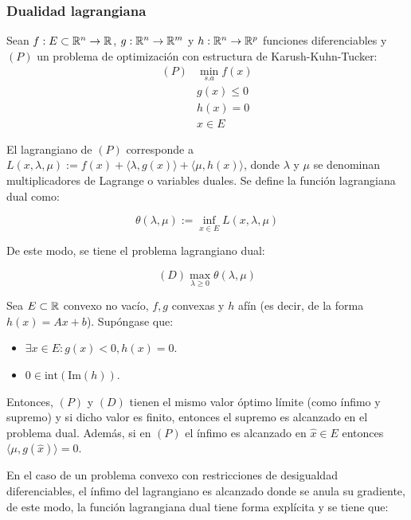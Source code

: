 \subsubsection{Dualidad lagrangiana}

Sean $f:E\subset\mathbb{R}^n\to\mathbb{R}$, $g:\mathbb{R}^n \to \mathbb{R}^m$ y $h:\mathbb{R}^n \to \mathbb{R}^p$ funciones diferenciables y $(P)$ un problema de optimización con estructura de Karush-Kuhn-Tucker:
\begin{equation}
	\begin{aligned}
		(P) & \min_{s.a} f(x)\\
		& g(x) \leq 0\\
		& h(x) = 0\\
		& x\in E
	\end{aligned}
\end{equation}
	

El lagrangiano de $(P)$ corresponde a $L(x,\lambda,\mu) := f(x) + \langle\lambda,g(x)\rangle + \langle\mu,h(x)\rangle$, donde $\lambda$ y $\mu$ se denominan multiplicadores de Lagrange o variables duales. Se define la función lagrangiana dual como:

\begin{equation}
	\theta(\lambda,\mu):=\inf_{x\in E} L(x,\lambda,\mu)
\end{equation} 

De este modo, se tiene el problema lagrangiano dual:

\begin{equation}
	(D) \max_{\lambda\geq 0} \theta(\lambda,\mu)
\end{equation}

\begin{theorem}
	Sea $E\subset\mathbb{R}$ convexo no vacío, $f,g$ convexas y $h$ afín (es decir, de la forma $h(x) = Ax+b$). Supóngase que:

\begin{itemize}
	\item $\exists x\in E:g(x)<0, h(x)=0$.
	\item $0\in \text{int}(\text{Im}(h))$.
\end{itemize}

Entonces, $(P)$ y $(D)$ tienen el mismo valor óptimo límite (como ínfimo y supremo) y si dicho valor es finito, entonces el supremo es alcanzado en el problema dual. Además, si en $(P)$ el ínfimo es alcanzado en $\hat{x}\in E$ entonces $\langle \mu,g(\hat{x})\rangle=0$.
\end{theorem}
	
En el caso de un problema convexo con restricciones de desigualdad diferenciables, el ínfimo del lagrangiano es alcanzado donde se anula su gradiente, de este modo, la función lagrangiana dual tiene forma explícita y se tiene que:

